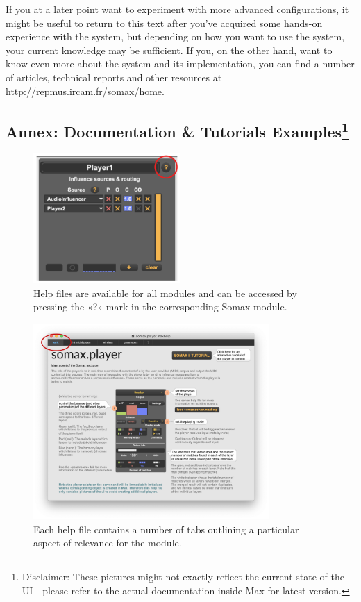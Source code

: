 \documentclass[11pt,a4paper]{report}
\begin{document}
If you at a later point want to experiment with more advanced configurations, it might be useful to return to this text after you've acquired some hands-on experience with the system, but depending on how you want to use the system, your current knowledge may be sufficient. If you, on the other hand, want to know even more about the system and its implementation, you can find a number of articles, technical reports and other resources at http://repmus.ircam.fr/somax/home.


\subsection*{Annex: Documentation \& Tutorials Examples\footnote{Disclaimer: These pictures might not exactly reflect the current state of the UI - please refer to the actual documentation inside Max for latest version.}}

 \begin{figure}[h!]
    \centering        
 	\includegraphics[width=0.5\textwidth, keepaspectratio]{img/getting-help1.png}
    \caption{Help files are available for all modules and can be accessed by pressing the «?»-mark in the corresponding Somax module.}
\end{figure}

 \begin{figure}[h!]
    \centering        
 	\includegraphics[width=0.8\textwidth, keepaspectratio]{img/getting-help2.png}
    \caption{Each help file contains a number of tabs outlining a particular aspect of relevance for the module.}
\end{figure}
\end{document}
